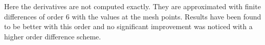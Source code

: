 \documentclass[proc]{edpsmath}
\begin{document}
\rmrk Here the derivatives are not computed exactly. They are approximated with finite differences of order 6 with the values at the mesh points. Results have been found to be better with this order and no significant improvement was noticed with a higher order difference scheme.
%
%
%
%
%
%
%
%
%
%
%
%
%
%
\end{document}
